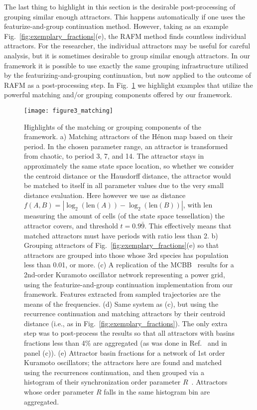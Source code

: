 \documentclass[9pt,twocolumn,twoside,lineno]{pnas-new}
\begin{document}
The last thing to highlight in this section is the desirable post-processing of grouping similar enough attractors. This happens automatically if one uses the featurize-and-group continuation method. However, taking as an example Fig.~\ref{fig:exemplary_fractions}(e), the RAFM method finds countless individual attractors. For the researcher, the individual attractors may be useful for careful analysis, but it is sometimes desirable to group similar enough attractors. In our framework it is possible to use exactly the same grouping infrastructure utilized by the featurizing-and-grouping continuation, but now applied to the outcome of RAFM as a post-processing step. In Fig.~\ref{fig:matching} we highlight examples that utilize the powerful matching and/or grouping components offered by our framework.

\begin{figure}
    \centering
    \texttt{[image: figure3\_matching]}
    \caption{Highlights of the matching or grouping components of the framework. a) Matching attractors of the H\'enon map based on their period. In the chosen parameter range, an attractor is transformed from chaotic, to period 3, 7, and 14. The attractor stays in approximately the same state space location, so whether we consider the centroid distance or the Hausdorff distance, the attractor would be matched to itself in all parameter values due to the very small distance evaluation. Here however we use as distance $f(A,B) = |\log_2(\mathrm{len}(A)) - \log_2(\mathrm{len}(B))|$, with $\mathrm{len}$ measuring the amount of cells (of the state space tessellation) the attractor covers, and threshold $t=0.9\bar{9}$. This effectively means that matched attractors must have periods with ratio less than 2. b) Grouping attractors of Fig.~\ref{fig:exemplary_fractions}(e) so that attractors are grouped into those whose 3rd species has population less than 0.01, or more. (c) A replication of the MCBB~\cite{Gelbrecht2020} results for a 2nd-order Kuramoto oscillator network representing a power grid, using the featurize-and-group continuation implementation from our framework. Features extracted from sampled trajectories are the means of the frequencies. (d) Same system as (c), but using the recurrence continuation and matching attractors by their centroid distance (i.e., as in Fig.~\ref{fig:exemplary_fractions}). The only extra step was to post-process the results so that all attractors with basins fractions less than 4\% are aggregated (as was done in Ref.~\cite{Gelbrecht2020} and in panel (c)). (e) Attractor basin fractions for a network of 1st order Kuramoto oscillators; the attractors here are found and matched using the recurrences continuation, and then grouped via a histogram of their synchronization order parameter $R$~\cite[Chap. 9]{DatserisBook}. Attractors whose order parameter $R$ falls in the same histogram bin are aggregated.
    }
    \label{fig:matching}
\end{figure}
\end{document}
